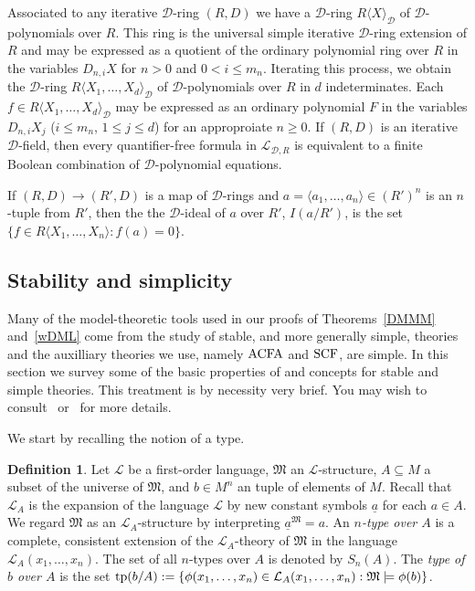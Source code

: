 \documentclass{amsart}
\newcommand{\ACFA}{{\rm ACFA}}
\newcommand{\SCF}{{\rm SCF}}
\newcommand{\cD}{{\mathcal D}}
\newcommand{\cL}{{\mathcal L}}
\newcommand{\fM}{{\mathfrak M}}
\newcommand{\tp}{{\rm tp}}
\theoremstyle{definition}
\newtheorem{Def}[thm]{Definition}
\theoremstyle{remark}
\begin{document}
Associated to any iterative $\cD$-ring $(R,D)$ we have a $\cD$-ring $R \langle X \rangle_\cD$ 
of $\cD$-polynomials over $R$.  This ring is the universal simple iterative $\cD$-ring
extension of $R$ and may be expressed as a quotient of the ordinary polynomial ring over $R$
in the variables $D_{n,i} X$ for $n > 0$ and $0 < i \leq m_n$.  
 Iterating this process, we obtain the $\cD$-ring $R \langle X_1, \ldots, X_d \rangle_\cD$
of $\cD$-polynomials over $R$ in $d$ indeterminates. Each $f \in R \langle X_1, \ldots, X_d \rangle_\cD$
may be expressed as an 
ordinary polynomial $F$ in the variables $D_{n,i} X_j$ ($i \leq m_n$, $1 \leq j \leq d$) for an 
approproiate $n \geq 0$.   If $(R,D)$ is an iterative $\cD$-field, then every quantifier-free 
formula in $\cL_{\cD, R}$ is equivalent to a finite Boolean combination of $\cD$-polynomial 
equations.   


If $(R,D) \to (R',D)$ is a map of $\cD$-rings and $a = \langle a_1, \ldots, a_n \rangle \in (R')^n$
is an $n$-tuple from $R'$, then the the $\cD$-ideal of $a$ over $R'$, $I(a/R')$, is the 
set $\{ f \in R \langle X_1, \ldots, X_n \rangle :  f(a) = 0 \}$.      


\subsection{Stability and simplicity}



Many of the model-theoretic tools used in our proofs of Theorems~\ref{DMMM} and~\ref{wDML} come 
from the study of stable, and more generally simple, theories and the auxilliary theories we use, namely
$\ACFA$ and $\SCF$, are simple.   In this section we survey some of the basic properties of and 
concepts for stable and simple theories.  This treatment is by necessity very brief.  You may wish to 
consult~\cite{Marker} or~\cite{Wagner} for more details.


We start by recalling the notion of a type.

\begin{Def}
Let $\cL$ be a first-order language, $\fM$ an $\cL$-structure, $A \subseteq M$ a subset of the 
universe of $\fM$, and $b \in M^n$ an tuple of elements of $M$.  Recall that 
$\cL_A$ is the expansion of the language $\cL$ by new constant symbols $\underline{a}$ for 
each $a \in A$.  We regard $\fM$ as an $\cL_A$-structure by interpreting $\underline{a}^\fM = a$.  
An \emph{$n$-type over $A$} is a complete, consistent extension of the $\cL_A$-theory of $\fM$ in
the language $\cL_A(x_1, \ldots, x_n)$.  
The set of all $n$-types over $A$ is denoted by $S_n(A)$.   The \emph{type of $b$ over $A$} is the set 
$\tp(b/A) := \{ \phi(x_1, \ldots, x_n) \in \cL_A(x_1, \ldots, x_n) : \fM \models \phi(b) \}$.
\end{Def}
\end{document}
